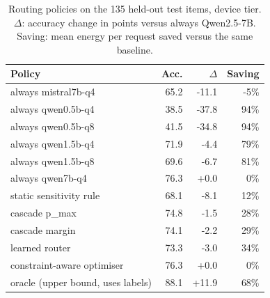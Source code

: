 \begin{table}[t]\centering\footnotesize
\caption{Routing policies on the 135 held-out test items, device tier. $\Delta$: accuracy change in points versus always Qwen2.5-7B. Saving: mean energy per request saved versus the same baseline.}\label{tab:routing}
\begin{tabular}{@{}lrrr@{}}\toprule
Policy & Acc. & $\Delta$ & Saving\\\midrule
always mistral7b-q4 & 65.2 & -11.1 & -5\%\\
always qwen0.5b-q4 & 38.5 & -37.8 & 94\%\\
always qwen0.5b-q8 & 41.5 & -34.8 & 94\%\\
always qwen1.5b-q4 & 71.9 & -4.4 & 79\%\\
always qwen1.5b-q8 & 69.6 & -6.7 & 81\%\\
always qwen7b-q4 & 76.3 & +0.0 & 0\%\\
static sensitivity rule & 68.1 & -8.1 & 12\%\\
cascade p\_max & 74.8 & -1.5 & 28\%\\
cascade margin & 74.1 & -2.2 & 29\%\\
learned router & 73.3 & -3.0 & 34\%\\
constraint-aware optimiser & 76.3 & +0.0 & 0\%\\
oracle (upper bound, uses labels) & 88.1 & +11.9 & 68\%\\
\bottomrule\end{tabular}\end{table}
